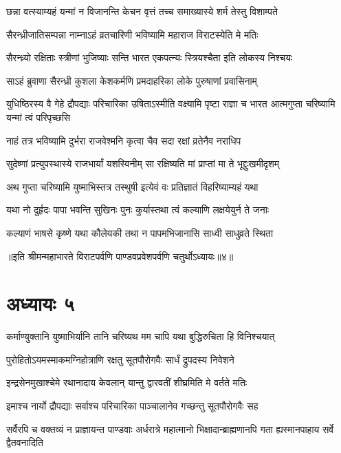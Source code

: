 \twolineshloka
{छन्ना वत्स्याम्यहं यन्मां न विजानन्ति केचन}
{वृत्तं तच्च समाख्यास्ये शर्म तेस्तु विशाम्पते}


\twolineshloka
{सैरन्ध्रीजातिसम्पन्ना नाम्नाऽहं व्रतचारिणी}
{भविष्यामि महाराज विराटस्येति मे मतिः}


\twolineshloka
{सैरन्ध्र्यो रक्षिताः स्त्रीणां भुजिष्याः सन्ति भारत}
{एकपत्न्यः स्त्रियश्चैता इति लोकस्य निश्चयः}


\twolineshloka
{साऽहं ब्रुवाणा सैरन्ध्री कुशला केशकर्मणि}
{प्रमदाहरिका लोके पुरुषाणां प्रवासिनाम्}


\threelineshloka
{युधिष्ठिरस्य वै गेहे द्रौपद्याः परिचारिका}
{उषिताऽस्मीति वक्ष्यामि पृष्टा राज्ञा च भारत}
{आत्मगुप्ता चरिष्यामि यन्मां त्वं परिपृच्छसि}


\twolineshloka
{नाहं तत्र भविष्यामि दुर्भरा राजवेश्मनि}
{कृत्वा चैव सदा रक्षां व्रतेनैव नराधिप}


\twolineshloka
{सुदेष्णां प्रत्युपस्थास्ये राजभार्यां यशस्विनीम्}
{सा रक्षिष्यति मां प्राप्तां मा ते भूद्दुःखमीदृशम्}


\twolineshloka
{अथ गुप्ता चरिष्यामि युष्माभिस्तत्र तस्थुषी}
{इत्येवं वः प्रतिज्ञातं विहरिष्याम्यहं यथा}




\twolineshloka
{यथा नो दुर्हृदः पापा भवन्ति सुखिनः पुनः}
{कुर्यास्तथा त्वं कल्याणि लक्षयेयुर्न ते जनाः}


\twolineshloka
{कल्याणं भाषसे कृष्णे यथा कौलेयकी तथा}
{न पापमभिजानासि साध्वी साधुव्रते स्थिता}

॥इति श्रीमन्महाभारते विराटपर्वणि पाण्डवप्रवेशपर्वणि चतुर्थोऽध्यायः॥४॥

\chapter{अध्यायः ५}

\twolineshloka
{कर्माण्युक्तानि युष्माभिर्यानि तानि चरिष्यथ}
{मम चापि यथा बुद्धिरुचिता हि विनिश्चयात्}


\twolineshloka
{पुरोहितोऽयमस्माकमग्निहोत्राणि रक्षतु}
{सूतपौरोगवैः सार्धं द्रुपदस्य निवेशने}


\twolineshloka
{इन्द्रसेनमुखाश्चेमे रथानादाय केवलान्}
{यान्तु द्वारवतीं शीघ्रमिति मे वर्तते मतिः}


\twolineshloka
{इमाश्च नार्यो द्रौपद्याः सर्वाश्च परिचारिका}
{पाञ्चालानेव गच्छन्तु सूतपौरोगवैः सह}


\threelineshloka
{सर्वैरपि च वक्तव्यं न प्राज्ञायन्त पाण्डवाः}
{अर्धरात्रे महात्मानो भिक्षादान्ब्राह्मणानपि}
{गता ह्यस्मानपाहाय सर्वे द्वैतवनादिति}


